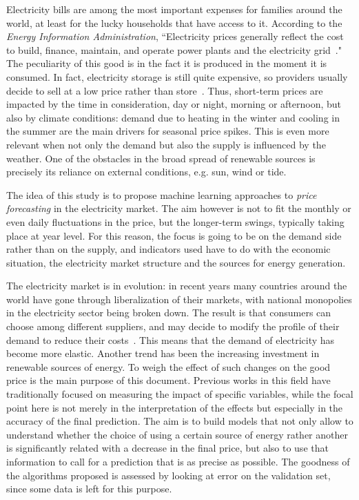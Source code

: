 \documentclass[a4paper,12pt]{book}
\begin{document}
Electricity bills are among the most important expenses for families around the world, at least for the lucky households that have access to it. According to the \textit{Energy Information Administration}, ``Electricity prices generally reflect the cost to build, finance, maintain, and operate power plants and the electricity grid~\cite{weron2014electricity}." The peculiarity of this good is in the fact it is produced in the moment it is consumed. In fact, electricity storage is still quite expensive, so providers usually decide to sell at a low price rather than store~\cite{fuchs2012technology}. Thus, short-term prices are impacted by the time in consideration, day or night, morning or afternoon, but also by climate conditions: demand due to heating in the winter and cooling in the summer are the main drivers for seasonal price spikes. This is even more relevant when not only the demand but also the supply is influenced by the weather. One of the obstacles in the broad spread of renewable sources is precisely its reliance on external conditions, e.g. sun, wind or tide.

The idea of this study is to propose machine learning approaches to \textit{price forecasting} in the electricity market. The aim however is not to fit the monthly or even daily fluctuations in the price, but the longer-term swings, typically taking place at year level. For this reason, the focus is going to be on the demand side rather than on the supply, and indicators used have to do with the economic situation, the electricity market structure and the sources for energy generation.

The electricity market is in evolution: in recent years many countries around the world have gone through liberalization of their markets, with national monopolies in the electricity sector being broken down. The result is that consumers can choose among different suppliers, and may decide to modify the profile of their demand to reduce their costs~\cite{867149}. This means that the demand of electricity has become more elastic. Another trend has been the increasing investment in renewable sources of energy. To weigh the effect of such changes on the good price is the main purpose of this document. Previous works in this field have traditionally focused on measuring the impact of specific variables, while the focal point here is not merely in the interpretation of the effects but especially in the accuracy of the final prediction. The aim is to build models that not only allow to understand whether the choice of using a certain source of energy rather another is significantly related with a decrease in the final price, but also to use that information to call for a prediction that is as precise as possible. The goodness of the algorithms proposed is assessed by looking at error on the validation set, since some data is left for this purpose.
\end{document}
